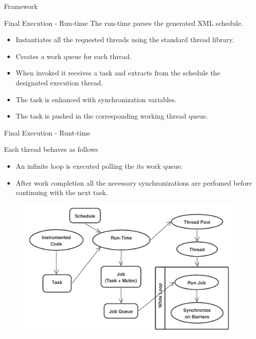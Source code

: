 \documentclass[xcolor=dvipsnames]{beamer}
\begin{document}
\begin{section}{Framework}
\begin{frame}{\hskip 0.3cm Final Execution - Run-time }
The run-time parses the generated XML schedule. 

\begin{itemize}

\item Instantiates all the requested threads using the standard thread library.

\item Creates a work queue for each thread.

\item When invoked it receives a task and extracts from the schedule the designated execution thread.

\item The task is enhanced with synchronization variables.

\item The task is pushed in the corresponding working  thread queue.

\end{itemize}

\end{frame}












\begin{frame}{\hskip 0.3cm Final Execution - Runt-time}

Each thread behaves as follows

\begin{itemize}

\item An infinite loop is executed polling the its work queue.

\item After work completion all the necessary synchronizations are perfomed before continuing with the next task.

\end{itemize}

\begin{figure}
\centering
\includegraphics[scale=0.40]{runtime_execution.pdf}
\end{figure}





\end{frame}
\end{section}
\end{document}
